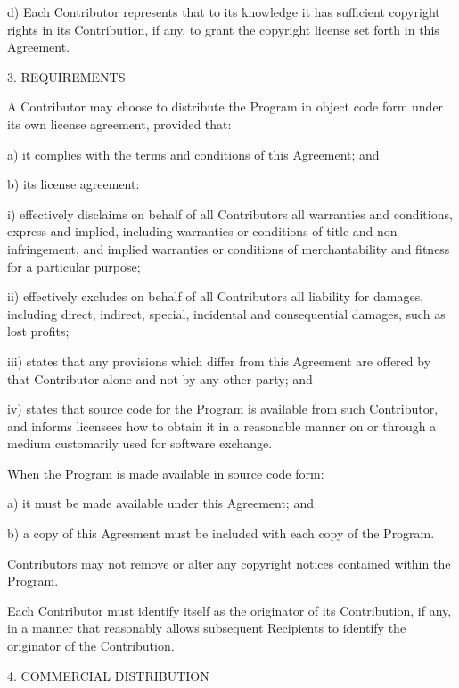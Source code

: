 \documentclass[10pt,letterpaper,titlepage]{article}
\begin{document}
d) Each Contributor represents that to its knowledge it has sufficient copyright rights in its Contribution, if any, to grant the copyright license set forth in this Agreement.

3. REQUIREMENTS

A Contributor may choose to distribute the Program in object code form under its own license agreement, provided that:

a) it complies with the terms and conditions of this Agreement; and

b) its license agreement:

i) effectively disclaims on behalf of all Contributors all warranties and conditions, express and implied, including warranties or conditions of title and non-infringement, and implied warranties or conditions of merchantability and fitness for a particular purpose;

ii) effectively excludes on behalf of all Contributors all liability for damages, including direct, indirect, special, incidental and consequential damages, such as lost profits;

iii) states that any provisions which differ from this Agreement are offered by that Contributor alone and not by any other party; and

iv) states that source code for the Program is available from such Contributor, and informs licensees how to obtain it in a reasonable manner on or through a medium customarily used for software exchange.

When the Program is made available in source code form:

a) it must be made available under this Agreement; and

b) a copy of this Agreement must be included with each copy of the Program.

Contributors may not remove or alter any copyright notices contained within the Program.

Each Contributor must identify itself as the originator of its Contribution, if any, in a manner that reasonably allows subsequent Recipients to identify the originator of the Contribution.

4. COMMERCIAL DISTRIBUTION
\end{document}
